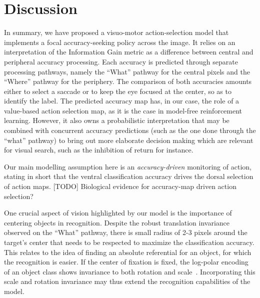 \section{Discussion}
\label{sec:discussion}



In summary, we have proposed a visuo-motor action-selection model that implements a focal accuracy-seeking policy across the image. It relies on an interpretation of the Information Gain metric as a difference between central and peripheral accuracy processing. Each accuracy is predicted through separate processing pathways, namely the ``What'' pathway for the central pixels and the ``Where'' pathway for the periphery.  The comparison of both accuracies amounts either to select a saccade or to keep the eye focused at the center, so as to identify the label. The predicted accuracy map has, in our case, the role of a value-based action selection map, as it is the case in model-free reinforcement learning. However, it also owns a probabilistic interpretation that may be combined with concurrent accuracy predictions (such as the one done through the ``what'' pathway) to bring out more elaborate decision making which are relevant for visual search, such as the inhibition of return for instance. 

Our main modelling assumption here is an \emph{accuracy-driven} monitoring of action, stating in short that the ventral classification accuracy drives the dorsal selection of action maps. {\color{magenta} [TODO] Biological evidence for accuracy-map driven action selection? }

One crucial aspect of vision highlighted by our model is the importance of centering objects in recognition. Despite the robust translation invariance observed on the ``What'' pathway, there is small radius of 2-3 pixels around the target's center that needs to be respected to maximize the classification accuracy. This relates to the idea of finding an absolute referential for an object, for which the recognition is easier. If the center of fixation is fixed, the log-polar encoding of an object class shows invariance to both rotation and scale~\citep{Traver10}. Incorporating this scale and rotation invariance may thus extend the recognition capabilities of the model.


